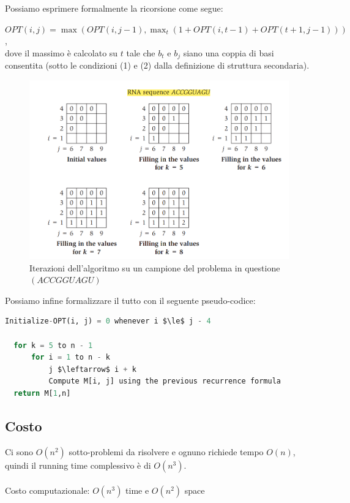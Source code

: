 Possiamo esprimere formalmente la ricorsione come segue:
\\
\begin{myblockquote}
  $OPT(i, j) = \max(OPT(i, j-1), \max_t(1+OPT(i, t-1)+OPT(t+1, j-1)))$,\\
  dove il massimo è calcolato su $t$ tale che $b_t$ e
  $b_j$ siano una coppia di basi consentita (sotto le condizioni (1) e
  (2) dalla definizione di struttura secondaria).
\end{myblockquote}



\begin{figure}[H]
  \includegraphics[width=12cm, keepaspectratio]{capitoli/programmazione_dinamica/imgs/rna4.png}
  \centering
  \caption{Iterazioni dell'algoritmo su un campione del problema in
    questione $(ACCGGUAGU)$}
\end{figure}


Possiamo infine formalizzare il tutto con il seguente pseudo-codice:

\begin{lstlisting}[language=Python, mathescape=true]
  Initialize-OPT(i, j) = 0 whenever i $\le$ j - 4

  for k = 5 to n - 1 
	  for i = 1 to n - k
		  j $\leftarrow$ i + k
		  Compute M[i, j] using the previous recurrence formula
  return M[1,n]
\end{lstlisting}

\subsection{Costo}

Ci sono $O(n^2)$ sotto-problemi da risolvere e ognuno richiede tempo
$O(n)$, quindi il running time complessivo è di $O(n^3)$.
\\
\\
Costo computazionale: $O(n^3)$ time e $O(n^2)$ space

